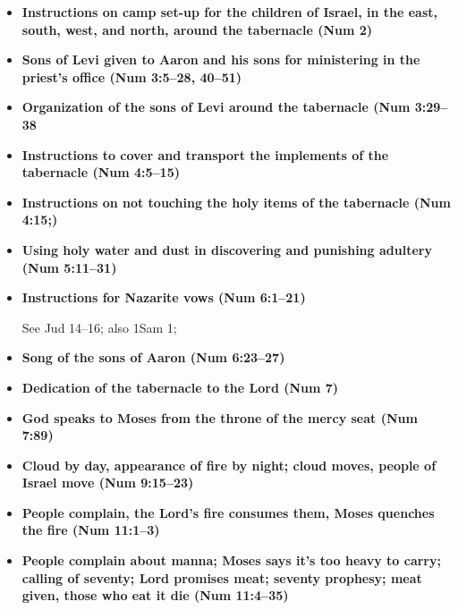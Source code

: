 \begin{itemize}
	The most important is in 12: ``And I will walk amon gyou, and will be your God, and ye shall be my people.'' Cf. Mos 7:69, ``And Enouch and all his people walked with God, and he dwelt in the midst of Zion.''

\item \textbf{Instructions on camp set-up for the children of Israel, in the east, south, west, and north, around the tabernacle (Num 2)}

\item \textbf{Sons of Levi given to Aaron and his sons for ministering in the priest's office (Num 3:5--28, 40--51)}

\item \textbf{Organization of the sons of Levi around the tabernacle (Num 3:29--38}

\item \textbf{Instructions to cover and transport the implements of the tabernacle (Num 4:5--15)}

\item \textbf{Instructions on not touching the holy items of the tabernacle (Num 4:15;)}

\item \textbf{Using holy water and dust in discovering and punishing adultery (Num 5:11--31)}

\item \textbf{Instructions for Nazarite vows (Num 6:1--21)}

	See Jud 14--16; also 1Sam 1;

\item \textbf{Song of the sons of Aaron (Num 6:23--27)}

\item \textbf{Dedication of the tabernacle to the Lord (Num 7)}

\item \textbf{God speaks to Moses from the throne of the mercy seat (Num 7:89)}

\item \textbf{Cloud by day, appearance of fire by night; cloud moves, people of Israel move (Num 9:15--23)}

\item \textbf{People complain, the Lord's fire consumes them, Moses quenches the fire (Num 11:1--3)}

\item \textbf{People complain about manna; Moses says it's too heavy to carry; calling of seventy; Lord promises meat; seventy prophesy; meat given, those who eat it die (Num 11:4--35)}


\end{itemize}
